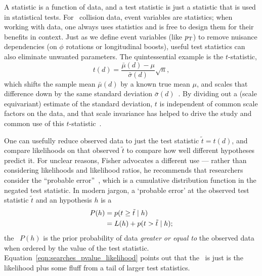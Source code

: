 A statistic is a function of data, and a test statistic is just a statistic
that is used in statistical tests.
For \atlas\ collision data, event variables are statistics; when working with
data, one always uses statistics and is free to design them for their benefits
in context.
Just as we define event variables (like $p_\mathrm{T}$) to remove nuisance
dependencies (on $\phi$ rotations or longitudinal boosts),
useful test statistics can also eliminate unwanted parameters.
The quintessential example is the $t$-statistic,
\begin{equation}
\label{eqn:searches_t_statistic}
t(d) = \frac{\bar{\mu}(d) - \mu}{\bar{\sigma}(d)}\sqrt{n}
,
\end{equation}
which shifts the sample mean $\bar{\mu}(d)$ by a known true mean $\mu$, and
scales that difference down by the same standard deviation
$\bar{\sigma}(d)$~\cite{student1908, fisher1925t}.
By dividing out a (scale equivariant) estimate of the standard deviation, $t$
is independent of common scale factors on the data, and that scale invariance
has helped to drive the study and common use of this
$t$-statistic~\cite{lehmann2011fisher}.

One can usefully reduce observed data to just the test statistic
$\tilde{t} = t(d)$, and compare likelihoods on that observed $\tilde{t}$
to compare how well different hypotheses predict it.
For unclear reasons, Fisher advocates a different use ---
rather than considering likelihoods and likelihood ratios, he recommends
that researchers consider the ``probable error''~\cite{fisher1921probable},
which is a cumulative distribution function in the negated test statistic.
In modern jargon, a `probable error' at the observed test statistic
$\tilde{t}$ and an hypothesis $h$ is a \textbf{\pvalue}
\begin{align}
P(h)
&= p(t \geq \tilde{t} \mid h)
\label{eqn:searches_pvalue}
\\
&= L(h) + p(t > \tilde{t} \mid h)
\label{eqn:searches_pvalue_likelihood}
;
\end{align}
the \pvalue\ $P(h)$ is the prior probability of data
\emph{greater or equal to} the observed data when ordered by the value of the
test statistic.
Equation~\ref{eqn:searches_pvalue_likelihood} points out that the \pvalue\ is
just is the likelihood plus some fluff from a tail of larger test statistics.

